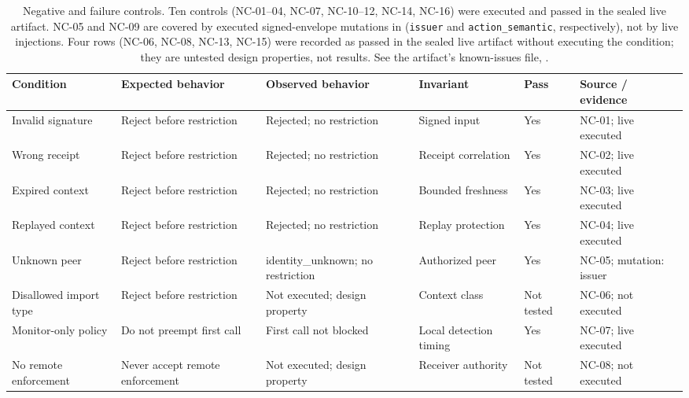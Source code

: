 \begin{table}[t]\centering\scriptsize
\caption{Negative and failure controls. Ten controls (NC-01--04, NC-07, NC-10--12, NC-14, NC-16) were executed and passed in the sealed live artifact. NC-05 and NC-09 are covered by executed signed-envelope mutations in \protect{} (\texttt{issuer} and \texttt{action\_semantic}, respectively), not by live injections. Four rows (NC-06, NC-08, NC-13, NC-15) were recorded as passed in the sealed live artifact without executing the condition; they are untested design properties, not results. See the artifact's known-issues file, \protect{}.}
\begin{tabular}{@{}p{}@{\hspace{0.7em}}p{}@{\hspace{0.7em}}p{}@{\hspace{0.7em}}p{}@{\hspace{0.7em}}p{}@{\hspace{0.7em}}p{}@{}}\toprule
Condition & Expected behavior & Observed behavior & Invariant & Pass & Source / evidence \\ \midrule
Invalid signature & Reject before restriction & Rejected; no restriction & Signed input & Yes & NC-01; live executed \\
Wrong receipt & Reject before restriction & Rejected; no restriction & Receipt correlation & Yes & NC-02; live executed \\
Expired context & Reject before restriction & Rejected; no restriction & Bounded freshness & Yes & NC-03; live executed \\
Replayed context & Reject before restriction & Rejected; no restriction & Replay protection & Yes & NC-04; live executed \\
Unknown peer & Reject before restriction & identity\_{}unknown; no restriction & Authorized peer & Yes & NC-05; mutation: issuer \\
Disallowed import type & Reject before restriction & Not executed; design property & Context class & Not tested & NC-06; not executed \\
Monitor-only policy & Do not preempt first call & First call not blocked & Local detection timing & Yes & NC-07; live executed \\
No remote enforcement & Never accept remote enforcement & Not executed; design property & Receiver authority & Not tested & NC-08; not executed \\

\end{tabular}
\end{table}

